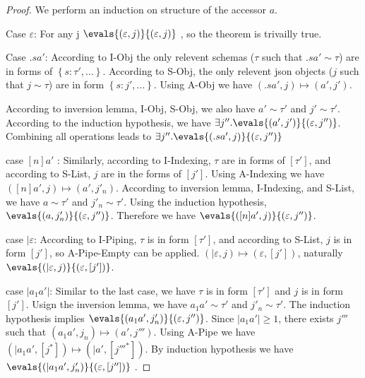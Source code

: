 \documentclass[11pt]{article}
\newcommand{\jarr}[1]{\left[#1\right]}   %
\newcommand{\jobj}[1]{\left\{#1\right\}} %
\newcommand{\matches}[2]{{#1}\sim{#2}}   %
\newcommand{\eval}[2]{#1 \boldsymbol{\mapsto} #2} %
\begin{document}
\begin{proof}
    We perform an induction on structure of the accessor $a$.

    Case $\varepsilon{}$: For any j  $\evals{(\varepsilon{},j)}{(\varepsilon{},j)}$ , so the theorem is trivailly true.

    Case $.sa'$: According to I-Obj  the only relevent schemas ($\tau$ such that $\matches{.sa'}{\tau}$) are in forms of $\jobj{s:\tau',...}$.
    According to S-Obj, the only relevent json objects ($j$ such that $\matches{j}{\tau}$) are in form $\jobj{s:j',...}$. 
    Using A-Obj we have $\eval{(.sa',j)}{(a',j')}$.

    According to inversion lemma, I-Obj, S-Obj, we also have $\matches{a'}{\tau{}'}$ and $\matches{j'}{\tau{}'}$.
    According to the induction hypothesis, we have $\exists j''.\evals{(a',j')}{(\varepsilon ,j'')}$.
    Combining all operations leads to $\exists j''. \evals{(.sa',j)}{(\varepsilon ,j'')}$

    case $[n]a'$ : Similarly, according to I-Indexing, $\tau$ are in forms of $\jarr{\tau'}$, and according to S-List, $j$ are in the forms of $\jarr{j'}$. Using A-Indexing we have $\eval{([n]a',j)}{(a',j'_n)}$.
    According to inversion lemma, I-Indexing, and S-List, we have $\matches{a}{\tau'}$ and $\matches{j'_n}{\tau'}$.
    Using the induction hypothesis, $\evals{(a,j'_n)}{(\varepsilon,j'')}$. Therefore we have $\evals{([n]a',j)}{(\varepsilon,j'')}$.

    case $|\varepsilon$: According to I-Piping, $\tau$ is in form $\jarr{\tau'}$, and according to S-List, $j$ is in form $\jarr{j'}$, so A-Pipe-Empty can be applied. $\eval{(|\varepsilon,j)}{(\varepsilon,\jarr{j'})}$, naturally $\evals{(|\varepsilon,j)}{(\varepsilon,\jarr{j'})}$.

    case $|a_1a'|$: Similar to the last case, we have $\tau$ is in form $\jarr{\tau'}$ and $j$ is in form $\jarr{j'}$. Usign the inversion lemma, we have $\matches{a_1a'}{\tau'}$ and $\matches{j'_n}{\tau'}$. The induction hypothesis implies $\evals{(a_1a',j'_n)}{(\varepsilon, j'')}$. Since $|a_1a'| \ge 1$, there exists $j'''$ such that $\eval{(a_1a',j_n)}{(a',j''')}$. %
    Using A-Pipe we have $\eval{(|a_1a',\jarr{j^*})}{(|a',\jarr{j'''^*})}$. By induction hypothesis we have $\evals{(|a_1a',j'_n)}{(\varepsilon, \jarr{j''})}$ .
\end{proof}
\end{document}
